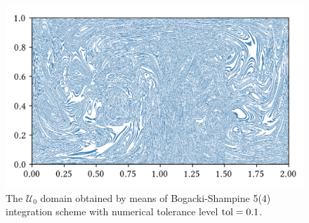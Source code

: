 \begin{figure}[htpb]
    \centering
    \includegraphics{figures/domain_figures/rkbs54_tol=0.1.png}
    \caption[The $\mathcal{U}_{0}$ domain obtained by means of
    Bogacki-Shampine 5(4) integration scheme with numerical tolerance level
    $\textnormal{tol}=0.1$]{
        The $\mathcal{U}_{0}$ domain obtained by means of Bogacki-Shampine 5(4)
    integration scheme with numerical tolerance level $\textnormal{tol}=0.1$.}
    \label{fig:u0_bs54}
\end{figure}
